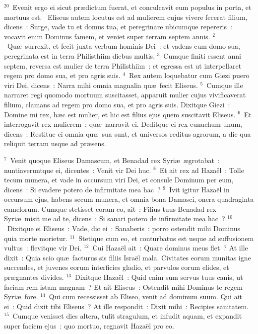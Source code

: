 ${}^{20}$~Evenit ergo ei sicut pr\ae dictum fuerat, et conculcavit eum populus in porta, et mortuus est.
~\lettrine[lines=10,image=true,loversize=0.05,lraise=-0.03]{E}{}liseus autem locutus est ad mulierem cujus vivere fecerat filium, dicens~: Surge, vade tu et domus tua, et peregrinare ubicumque repereris~: vocavit enim Dominus famem, et veniet super terram septem annis.
${}^{2}$~Qu\ae\ surrexit, et fecit juxta verbum hominis Dei~: et vadens cum domo sua, peregrinata est in terra Philisthiim diebus multis.
${}^{3}$~Cumque finiti essent anni septem, reversa est mulier de terra Philisthiim~: et egressa est ut interpellaret regem pro domo sua, et pro agris suis.
${}^{4}$~Rex autem loquebatur cum Giezi puero viri Dei, dicens~: Narra mihi omnia magnalia qu\ae\ fecit Eliseus.
${}^{5}$~Cumque ille narraret regi quomodo mortuum suscitasset, apparuit mulier cujus vivificaverat filium, clamans ad regem pro domo sua, et pro agris suis. Dixitque Giezi~: Domine mi rex, h\ae c est mulier, et hic est filius ejus quem suscitavit Eliseus.
${}^{6}$~Et interrogavit rex mulierem~: qu\ae\ narravit ei. Deditque ei rex eunuchum unum, dicens~: Restitue ei omnia qu\ae\ sua sunt, et universos reditus agrorum, a die qua reliquit terram usque ad pr\ae sens.


${}^{7}$~Venit quoque Eliseus Damascum, et Benadad rex Syri\ae\ \ae grotabat~: nuntiaveruntque ei, dicentes~: Venit vir Dei huc.
${}^{8}$~Et ait rex ad Haza\"el~: Tolle tecum munera, et vade in occursum viri Dei, et consule Dominum per eum, dicens~: Si evadere potero de infirmitate mea hac~?
${}^{9}$~Ivit igitur Haza\"el in occursum ejus, habens secum munera, et omnia bona Damasci, onera quadraginta camelorum. Cumque stetisset coram eo, ait~: Filius tuus Benadad rex Syri\ae\ misit me ad te, dicens~: Si sanari potero de infirmitate mea hac~?
${}^{10}$~Dixitque ei Eliseus~: Vade, dic ei~: Sanaberis~: porro ostendit mihi Dominus quia morte morietur.
${}^{11}$~Stetique cum eo, et conturbatus est usque ad suffusionem vultus~: flevitque vir Dei.
${}^{12}$~Cui Haza\"el ait~: Quare dominus meus flet~? At ille dixit~: Quia scio qu\ae\ facturus sis filiis Isra\"el mala. Civitates eorum munitas igne succendes, et juvenes eorum interficies gladio, et parvulos eorum elides, et pr\ae gnantes divides.
${}^{13}$~Dixitque Haza\"el~: Quid enim sum servus tuus canis, ut faciam rem istam magnam~? Et ait Eliseus~: Ostendit mihi Dominus te regem Syri\ae\ fore.
${}^{14}$~Qui cum recessisset ab Eliseo, venit ad dominum suum. Qui ait ei~: Quid dixit tibi Eliseus~? At ille respondit~: Dixit mihi~: Recipies sanitatem.
${}^{15}$~Cumque venisset dies altera, tulit stragulum, et infudit aquam, et expandit super faciem ejus~: quo mortuo, regnavit Haza\"el pro eo.


